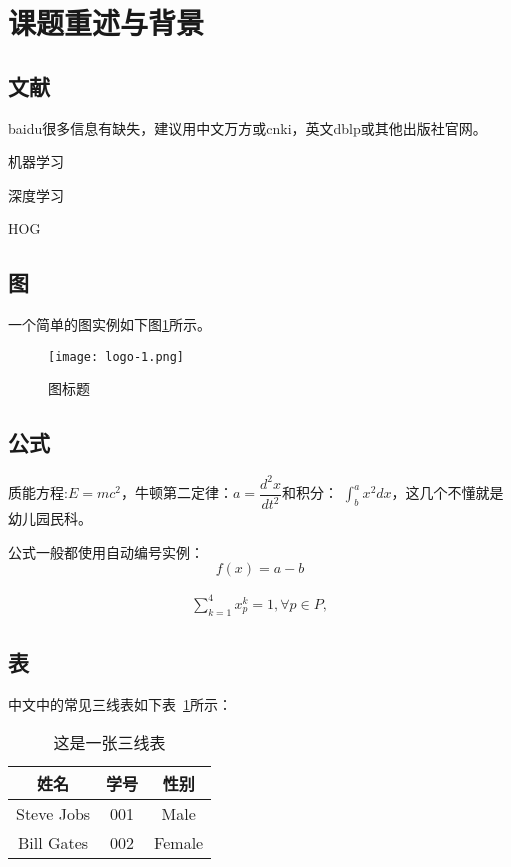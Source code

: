 \section{课题重述与背景}
\subsection{文献}
baidu很多信息有缺失，建议用中文万方或cnki，英文dblp或其他出版社官网。

机器学习~\cite{qiu2020nndl}

深度学习~\cite{LeCun2015deep}

HOG~\cite{dalal2005hog}



\subsection{图}
一个简单的图实例如下图\ref{1-1}所示。
\begin{figure}[H]
\centering
\texttt{[image: logo-1.png]}
\caption{图标题}
\label{1-1}
\end{figure}

\subsection{公式}

质能方程:$E=mc^2$，牛顿第二定律：$a=\dfrac {d^2x}{dt^2}$和积分：
$\int^a_bx^2dx$，这几个不懂就是幼儿园民科。

公式一般都使用自动编号实例：
\begin{equation}
f(x) = a - b 
\end{equation}



\begin{equation}
  \begin{aligned}
    \sum_{k=1}^{4}x_p^k=1,\forall p\in P,
  \end{aligned}
\end{equation}

\subsection{表}


中文中的常见三线表如下表~\ref{tab:1-1}所示：

\begin{table}[!htbp]
\centering
\caption{这是一张三线表}\label{tab:1-1}%
\begin{tabular}{ccc}
\toprule
姓名            & 学号  & 性别\\
\midrule
Steve Jobs      & 001   & Male\\
Bill Gates      & 002   & Female\\
\bottomrule
\end{tabular}
\end{table}






\clearpage
